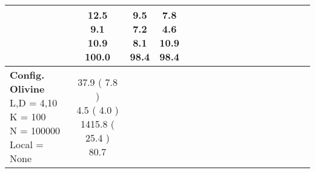 \documentclass[9pt]{article}
\begin{document}
\begin{landscape}
\begin{longtable}{ l | c c c c | c c c c | c c c c | c c c c |}
             &
                            \makecell{              12.5
     \\
            {\footnotesize             9.1
    } \\  {\footnotesize             10.9
     } \\
            {\small \textcolor[rgb]{ 0.2 , 0.7 , 0.1} {100.0  }
} }
             &                         \makecell{              9.5
     \\
            {\footnotesize             7.2
    } \\  {\footnotesize             8.1
     } \\
            {\small \textcolor[rgb]{ 0.232 , 0.669 , 0.1} {98.4  }
} }
             &
                            \makecell{              \textbf{ 7.8 }
     \\
            {\footnotesize             \textbf{ 4.6 }
    } \\  {\footnotesize             10.9
     } \\
            {\small \textcolor[rgb]{ 0.232 , 0.669 , 0.1} {98.4  }
} }
            

 \\
                                                            
                    \hline
                    \makecell{ \textbf{ Config. Olivine} \\
                    { \small L,D = 4,10} \\
                    {\small K = 100} \\
                    {\small N = 100000 } \\ {\small Local = None }} &
                    
                            \makecell{              37.9
     (             7.8
    ) \\
            {\footnotesize             4.5
     (              4.0
     )} \\
            {\footnotesize             1415.8
     (            25.4
    ) } \\
            {\small  \textcolor[rgb]{ 0.586 , 0.314 , 0.1} {80.7  }
} }



\end{longtable}
\end{landscape}
\end{document}
